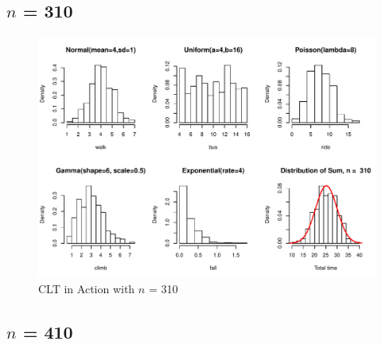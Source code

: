 \documentclass[11pt,letter]{article}\usepackage[]{graphicx}\usepackage[]{color}
\makeatletter
\def\maxwidth{ %
  \ifdim\Gin@nat@width>\linewidth
    \linewidth
  \else
    \Gin@nat@width
  \fi
}
\newenvironment{knitrout}{}{} %
\makeatother
\begin{document}
\subsection{$n$ = 310}

\begin{knitrout}
\color{fgcolor}\begin{figure}[h]

{\centering \includegraphics[width=\maxwidth]{figure/n-310-1} 

}

\caption[CLT in Action with ]{CLT in Action with $n$ = 310}\label{fig:n-310}
\end{figure}


\end{knitrout}
\newpage
\subsection{$n$ = 410}
\end{document}
